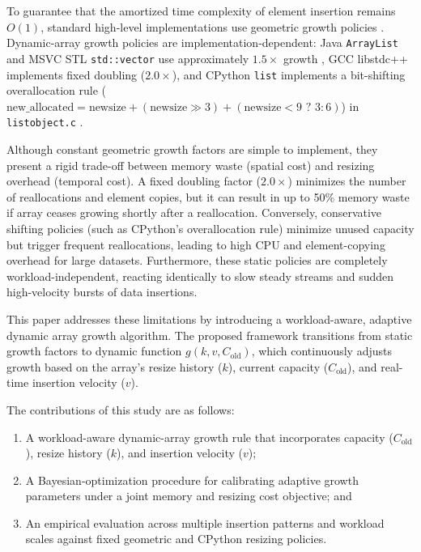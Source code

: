 \documentclass[conference]{IEEEtran}
\begin{document}
To guarantee that the amortized time complexity of element insertion remains $O(1)$, standard high-level implementations use geometric growth policies \cite{optimal_resizable}. Dynamic-array growth policies are implementation-dependent: Java \texttt{ArrayList} and MSVC STL \texttt{std::vector} use approximately $1.5\times$ growth \cite{java_data_structures}, GCC libstdc++ implements fixed doubling ($2.0\times$), and CPython \texttt{list} implements a bit-shifting overallocation rule ($\text{new\_allocated} = \text{newsize} + (\text{newsize} \gg 3) + (\text{newsize} < 9 \,\,?\,\, 3 : 6)$) in \texttt{listobject.c} \cite{python_list_impl}.

Although constant geometric growth factors are simple to implement, they present a rigid trade-off between memory waste (spatial cost) and resizing overhead (temporal cost). A fixed doubling factor ($2.0\times$) minimizes the number of reallocations and element copies, but it can result in up to 50\% memory waste if array ceases growing shortly after a reallocation. Conversely, conservative shifting policies (such as CPython's overallocation rule) minimize unused capacity but trigger frequent reallocations, leading to high CPU and element-copying overhead for large datasets. Furthermore, these static policies are completely workload-independent, reacting identically to slow steady streams and sudden high-velocity bursts of data insertions.

This paper addresses these limitations by introducing a workload-aware, adaptive dynamic array growth algorithm. The proposed framework transitions from static growth factors to dynamic function $g(k, v, C_{\text{old}})$, which continuously adjusts growth based on the array's resize history ($k$), current capacity ($C_{\text{old}}$), and real-time insertion velocity ($v$).

The contributions of this study are as follows:
\begin{enumerate}
    \item A workload-aware dynamic-array growth rule that incorporates capacity ($C_{\text{old}}$), resize history ($k$), and insertion velocity ($v$);
    \item A Bayesian-optimization procedure for calibrating adaptive growth parameters under a joint memory and resizing cost objective; and
    \item An empirical evaluation across multiple insertion patterns and workload scales against fixed geometric and CPython resizing policies.
\end{enumerate}
\end{document}
